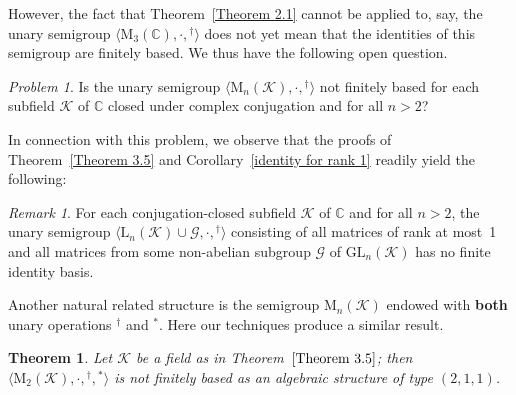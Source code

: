 \documentclass[11pt,reqno]{amsart}
\numberwithin{equation}{section}
\def\bb{\mathbb}
\newtheorem{Thm}{Theorem}[section]
\theoremstyle{remark}
\newtheorem{Rmk}{Remark}[section]
\newtheorem{Problem}{Problem}[section]
\begin{document}
However, the fact that Theorem~\ref{Theorem 2.1} cannot be applied
to, say, the unary semigroup $\langle\mathrm{M}_3(\bb
C),\cdot,{}^\dag\rangle$ does not yet mean that the identities of
this semigroup are finitely based. We thus have the following open
question.
\begin{Problem}
\label{problem on Moore-Penrose} Is the unary semigroup
$\langle\mathrm{M}_n(\mathcal{K}),\cdot,{}^\dag\rangle$ not
finitely based for each subfield $\mathcal{K}$ of $\bb C$ closed
under complex conjugation and for all $n>2$?
\end{Problem}

In connection with this problem, we observe that the proofs of
Theorem~\ref{Theorem 3.5} and Corollary~\ref{identity for rank 1}
readily yield the following:
\begin{Rmk}
\label{rank 1 + invertible} For each conjugation-closed subfield
$\mathcal{K}$ of $\bb C$  and for all $n>2$, the unary semigroup
$\langle\mathrm{L}_n(\mathcal{K})\cup\mathcal{G},\cdot,{}^\dag\rangle$
consisting of all matrices of rank at most~1 and all matrices from
some non-abelian subgroup $\mathcal{G}$ of
$\mathrm{GL}_n(\mathcal{K})$ has no finite identity basis.
\end{Rmk}

Another natural related structure is the semigroup
$\textrm{M}_n(\mathcal{K})$ endowed with \textbf{both} unary
operations ${}^\dag$ and ${}^*$. Here our techniques produce a
similar result.
\begin{Thm}\label{both operations}
Let $\mathcal{K}$ be a field as in Theorem~$\ref{Theorem 3.5}$;
then $\langle\mathrm{M}_2(\mathcal{K}),\cdot,{}^\dag,{}^*\rangle$
is not finitely based as an algebraic structure of type $(2,1,1)$.
\end{Thm}
\end{document}
